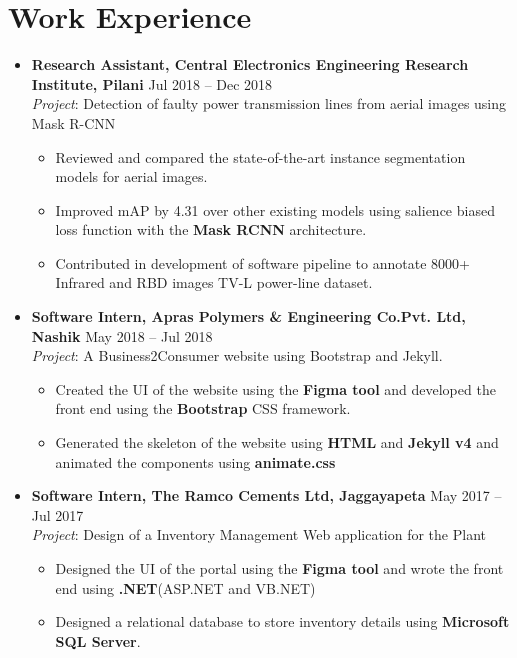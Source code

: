 \documentclass[a4paper]{article}
\newcommand{\resumeSubheading}[2]{
	\vspace{-1pt}\item
	{\textbf{\noindent #1}} \hfill {#2} \\
}
\newcommand{\resumeSubItemOneArg}[1]{\item \small #1\vspace{-1pt}}
\newcommand{\resumeSubHeadingListStart}{\begin{itemize}[leftmargin=*]}
\newcommand{\resumeSubHeadingListEnd}{\end{itemize}}
\newcommand{\resumeItemListStart}{\begin{itemize} \vspace*{-5pt}}
\newcommand{\resumeItemListEnd}{\end{itemize}}
\begin{document}

\section{Work Experience}
\justifying
\resumeSubHeadingListStart
\resumeSubheading
{Research Assistant, Central Electronics Engineering Research Institute, Pilani}{Jul 2018 -- Dec 2018}
\emph{Project}: Detection of faulty power transmission lines from aerial images using Mask R-CNN
\resumeItemListStart
\resumeSubItemOneArg{Reviewed and compared the state-of-the-art instance segmentation models for aerial images.}
\resumeSubItemOneArg{Improved mAP by 4.31 over other existing models using salience biased loss function with the \textbf{Mask RCNN} architecture.}
\resumeSubItemOneArg{Contributed in development of software pipeline to annotate 8000+ Infrared and RBD images TV-L power-line dataset.}
\resumeItemListEnd
\vspace{-5pt}
\resumeSubheading
{Software Intern, Apras Polymers \& Engineering Co.Pvt. Ltd, Nashik}{May 2018 -- Jul 2018}
\emph{Project}: A Business2Consumer website using Bootstrap and Jekyll.
\resumeItemListStart
\resumeSubItemOneArg{Created the UI of the website using the \textbf{Figma tool} and developed the front end using the \textbf{Bootstrap} CSS framework.}
\resumeSubItemOneArg{Generated the skeleton of the website using \textbf{HTML} and \textbf{Jekyll v4} and animated the components using \textbf{animate.css}}
\resumeItemListEnd
\vspace{-5pt}
\resumeSubheading
{Software Intern, The Ramco Cements Ltd, Jaggayapeta}{May 2017 -- Jul 2017}
\emph{Project}: Design of a Inventory Management Web application for the Plant
\resumeItemListStart
\resumeSubItemOneArg{Designed the UI of the portal using the \textbf{Figma tool} and wrote the front end using \textbf{.NET}(ASP.NET and VB.NET)}
\resumeSubItemOneArg{Designed a relational database to store inventory details using \textbf{Microsoft SQL Server}.}

	\vspace{-5pt}
\resumeSubHeadingListEnd
\resumeSubHeadingListEnd
\vspace{-5pt}
\end{document}

